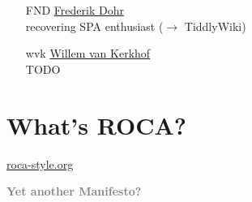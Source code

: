 \documentclass{beamer}
\begin{document}
\begin{frame}{\insertsectionhead}
  \begin{itemize}
    \item[FND] \href{mailto:fnd@innoq.com}{Frederik Dohr} \\
        recovering SPA enthusiast (\ensuremath{\rightarrow} TiddlyWiki)
    \item[]
    \item[wvk] \href{mailto:wvk@innoq.com}{Willem van Kerkhof} \\
        TODO
  \end{itemize}

\end{frame}

\section{What's ROCA?}

{
  \begin{frame}
    \vspace*{-2.5in}
    \href{http://roca-style.org}{roca-style.org}

  \end{frame}
}

\begin{frame}
  \textcolor{gray}{
    \begin{center}
      \textbf{
        \fontsize{60}{70}\selectfont Yet another Manifesto?
      }
    \end{center}
  }

\end{frame}
\end{document}
